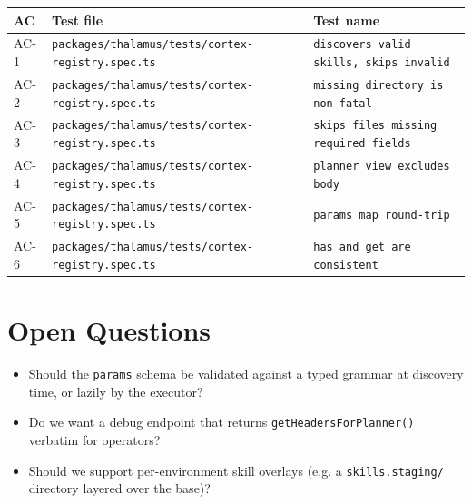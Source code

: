 \begin{center}
\begin{tabular}{@{}lll@{}}
\toprule
AC & Test file & Test name \\
\midrule
AC-1 & \texttt{packages/thalamus/tests/cortex-registry.spec.ts} & \texttt{discovers valid skills, skips invalid} \\
AC-2 & \texttt{packages/thalamus/tests/cortex-registry.spec.ts} & \texttt{missing directory is non-fatal} \\
AC-3 & \texttt{packages/thalamus/tests/cortex-registry.spec.ts} & \texttt{skips files missing required fields} \\
AC-4 & \texttt{packages/thalamus/tests/cortex-registry.spec.ts} & \texttt{planner view excludes body} \\
AC-5 & \texttt{packages/thalamus/tests/cortex-registry.spec.ts} & \texttt{params map round-trip} \\
AC-6 & \texttt{packages/thalamus/tests/cortex-registry.spec.ts} & \texttt{has and get are consistent} \\
\bottomrule
\end{tabular}
\end{center}

\section{Open Questions}
\begin{itemize}[leftmargin=1.2em]
  \item Should the \texttt{params} schema be validated against a typed grammar at discovery time, or lazily by the executor?
  \item Do we want a debug endpoint that returns \texttt{getHeadersForPlanner()} verbatim for operators?
  \item Should we support per-environment skill overlays (e.g. a \texttt{skills.staging/} directory layered over the base)?
\end{itemize}


